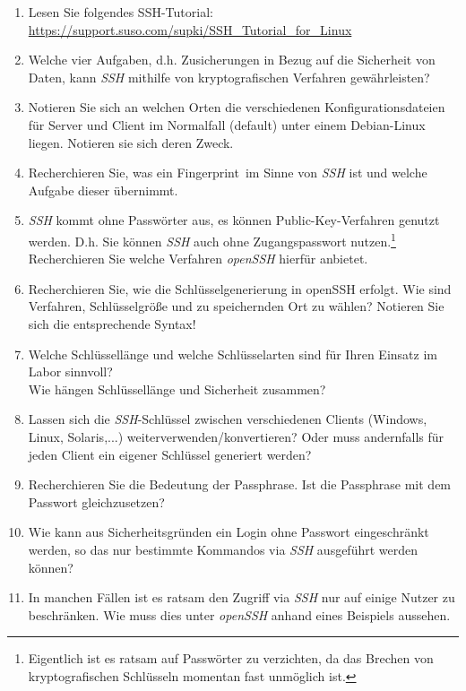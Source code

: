 \documentclass[paper=a4,fontsize=11pt]{scrartcl}%
\begin{document}
	\begin{enumerate}
		\item Lesen Sie folgendes SSH-Tutorial: \url{https://support.suso.com/supki/SSH_Tutorial_for_Linux}
		\item Welche vier Aufgaben, d.h. Zusicherungen in Bezug auf die Sicherheit von Daten, kann \emph{SSH} mithilfe von kryptografischen Verfahren gewährleisten?	
		\item Notieren Sie sich an welchen Orten die verschiedenen Konfigurationsdateien für Server und Client im Normalfall (default) unter einem Debian-Linux liegen. Notieren sie sich deren Zweck.
		\item Recherchieren Sie, was ein \glqq Fingerprint\grqq\ im Sinne von \emph{SSH} ist und welche Aufgabe dieser übernimmt. 
		\item \emph{SSH} kommt ohne Passwörter aus, es können Public-Key-Verfahren genutzt werden. D.h. Sie können \emph{SSH} auch ohne Zugangspasswort nutzen.\footnote{Eigentlich ist es ratsam auf Passwörter zu verzichten, da das Brechen von kryptografischen Schlüsseln momentan fast unmöglich ist.}\\
		Recherchieren Sie welche Verfahren \emph{openSSH} hierfür anbietet.
		\item Recherchieren Sie, wie die Schlüsselgenerierung in openSSH erfolgt. Wie sind Verfahren, Schlüsselgröße und zu speichernden Ort zu wählen? Notieren Sie sich die entsprechende Syntax!
		\item Welche Schlüssellänge und welche Schlüsselarten sind für Ihren Einsatz im Labor sinnvoll?\\
		Wie hängen Schlüssellänge und Sicherheit zusammen?
		\item Lassen sich die \emph{SSH}-Schlüssel zwischen verschiedenen Clients (Windows, Linux, Solaris,...) weiterverwenden/konvertieren? Oder muss andernfalls für jeden Client ein eigener Schlüssel generiert werden?
		\item Recherchieren Sie die Bedeutung der Passphrase. Ist die Passphrase mit dem Passwort gleichzusetzen?
		\item Wie kann aus Sicherheitsgründen ein Login ohne Passwort eingeschränkt werden, so das nur bestimmte Kommandos via \emph{SSH} ausgeführt werden können?
		\item In manchen Fällen ist es ratsam den Zugriff via \emph{SSH} nur auf einige Nutzer zu beschränken. Wie muss dies unter \emph{openSSH} anhand eines Beispiels aussehen.
	\end{enumerate}
	
\end{document}

